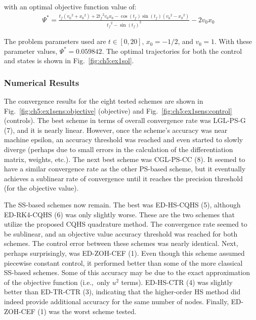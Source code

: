 \noindent with an optimal objective function value of:
\begin{align}
\Psi^* = \frac{t_f \left({v_{0}}^2+{x_{0}}^2\right)+2 {t_f}^2 v_{0} x_{0}-\cos\left(t_f\right) \sin\left(t_f\right) \left({v_{0}}^2-{x_{0}}^2\right)}{{{t_f}^2 - \sin\left(t_f\right)}^2} -2 v_{0} x_{0}
\end{align}

\noindent The problem parameters used are $t \in [0, 20]$, $x_0 = -1/2$, and $v_0 = 1$.
With these parameter values, $\Psi^* = 0.059842$.
The optimal trajectories for both the control and states is shown in Fig.~\ref{fig:ch5:ex1sol}.

\subsubsection{Numerical Results}

The convergence results for the eight tested schemes are shown in Fig.~\ref{fig:ch5:ex1sens:objective} (objective) and Fig.~\ref{fig:ch5:ex1sens:control} (controls).
The best scheme in terms of overall convergence rate was LGL-PS-G (7), and it is nearly linear.
However, once the scheme's accuracy was near machine epsilon, an accuracy threshold was reached and even started to slowly diverge (perhaps due to small errors in the calculation of the differentiation matrix, weights, etc.).
The next best scheme was CGL-PS-CC (8). 
It seemed to have a similar convergence rate as the other PS-based scheme, but it eventually achieves a sublinear rate of convergence until it reaches the precision threshold (for the objective value).

The SS-based schemes now remain. The best was ED-HS-CQHS (5), although ED-RK4-CQHS (6) was only slightly worse.
These are the two schemes that utilize the proposed CQHS quadrature method.
The convergence rate seemed to be sublinear, and an objective value accuracy threshold was reached for both schemes.
The control error between these schemes was nearly identical.
Next, perhaps surprisingly, was ED-ZOH-CEF (1).
Even though this scheme assumed piecewise constant control, it performed better than some of the more classical SS-based schemes.
Some of this accuracy may be due to the exact approximation of the objective function (i.e.,~only $u^2$ terms). 
ED-HS-CTR (4) was slightly better than ED-TR-CTR (3), indicating that the higher-order HS method did indeed provide additional accuracy for the same number of nodes.
Finally, ED-ZOH-CEF (1) was the worst scheme tested.

